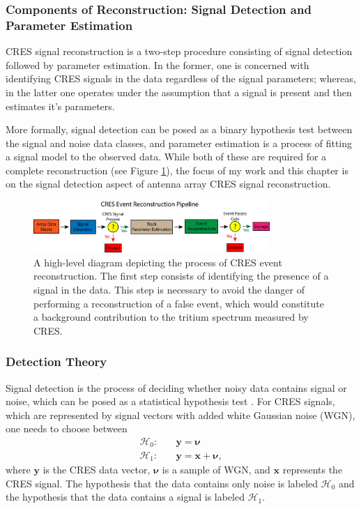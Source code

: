 \subsubsection*{Components of Reconstruction: Signal Detection and Parameter Estimation}

CRES signal reconstruction is a two-step procedure consisting of signal detection followed by parameter estimation. In the former, one is concerned with identifying CRES signals in the data regardless of the signal parameters; whereas, in the latter one operates under the assumption that a signal is present and then estimates it's parameters. 

More formally, signal detection can be posed as a binary hypothesis test between the signal and noise data classes, and parameter estimation is a process of fitting a signal model to the observed data. While both of these are required for a complete reconstruction (see Figure \ref{fig:chap4-pter-pipeline}), the focus of my work and this chapter is on the signal detection aspect of antenna array CRES signal reconstruction.

\begin{figure}[htbp]
    \centering
    \includegraphics[width=0.8\textwidth]{figs/Chapter-4/230108_deepfilter_paper_event_reconstruction_pipeline.png}
    \caption{A high-level diagram depicting the process of CRES event reconstruction. The first step consists of identifying the presence of a signal in the data. This step is necessary to avoid the danger of performing a reconstruction of a false event, which would constitute a background contribution to the tritium spectrum measured by CRES.}
    \label{fig:chap4-pter-pipeline}
\end{figure}

\subsubsection*{Detection Theory}


Signal detection is the process of deciding whether noisy data contains signal or noise, which can be posed as a statistical hypothesis test \cite{detection_theory}. For CRES signals, which are represented by signal vectors with added white Gaussian noise (WGN), one needs to choose between
\begin{align}
    \mathcal{H}_0:&\quad\bm{y}=\bm{\nu}\\
    \mathcal{H}_1:&\quad\bm{y}=\bm{x}+\bm{\nu},
\end{align}
where $\bm{y}$ is the CRES data vector, $\bm{\nu}$ is a sample of WGN, and $\bm{x}$ represents the CRES signal. The hypothesis that the data contains only noise is labeled $\mathcal{H}_0$ and the hypothesis that the data contains a signal is labeled $\mathcal{H}_1$.

